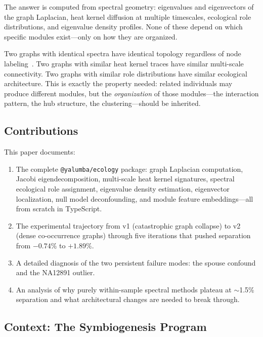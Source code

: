 \documentclass{../yalumba}
\begin{document}
The answer is computed from spectral geometry: eigenvalues and eigenvectors of
the graph Laplacian, heat kernel diffusion at multiple timescales, ecological
role distributions, and eigenvalue density profiles.  None of these depend on
which specific modules exist---only on how they are organized.


Two graphs with identical spectra have identical topology regardless of node
labeling~\cite{fang2012selection}.  Two graphs with similar heat kernel traces
have similar multi-scale connectivity.  Two graphs with similar role
distributions have similar ecological architecture.  This is exactly the
property needed: related individuals may produce different modules, but the
\emph{organization} of those modules---the interaction pattern, the hub
structure, the clustering---should be inherited.

\subsection{Contributions}

This paper documents:

\begin{enumerate}
  \item The complete \texttt{@yalumba/ecology} package: graph Laplacian
    computation, Jacobi eigendecomposition, multi-scale heat kernel signatures,
    spectral ecological role assignment, eigenvalue density estimation,
    eigenvector localization, null model deconfounding, and module feature
    embeddings---all from scratch in TypeScript.
  \item The experimental trajectory from v1 (catastrophic graph collapse) to v2
    (dense co-occurrence graphs) through five iterations that pushed separation
    from $-0.74\%$ to $+1.89\%$.
  \item A detailed diagnosis of the two persistent failure modes: the spouse
    confound and the NA12891 outlier.
  \item An analysis of why purely within-sample spectral methods plateau at
    $\sim$1.5\% separation and what architectural changes are needed to break
    through.
\end{enumerate}

\subsection{Context: The Symbiogenesis Program}
\end{document}
